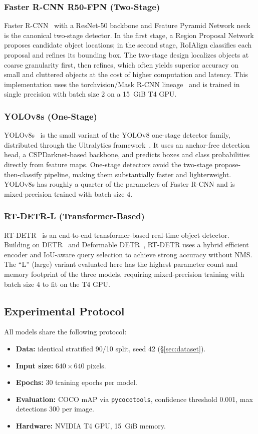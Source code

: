 \documentclass[11pt,a4paper]{article}
\begin{document}
\subsubsection{Faster R-CNN R50-FPN (Two-Stage)}
Faster R-CNN~\cite{fasterrcnn2015} with a ResNet-50 backbone and Feature Pyramid Network neck~\cite{fpn2017} is the canonical two-stage detector. In the first stage, a Region Proposal Network proposes candidate object locations; in the second stage, RoIAlign classifies each proposal and refines its bounding box. The two-stage design localizes objects at coarse granularity first, then refines, which often yields superior accuracy on small and cluttered objects at the cost of higher computation and latency. This implementation uses the torchvision/Mask R-CNN lineage~\cite{maskrcnn2017} and is trained in single precision with batch size 2 on a 15~GiB T4 GPU.

\subsubsection{YOLOv8s (One-Stage)}
YOLOv8s~\cite{yolov8_2023} is the small variant of the YOLOv8 one-stage detector family, distributed through the Ultralytics framework~\cite{ultralytics}. It uses an anchor-free detection head, a CSPDarknet-based backbone, and predicts boxes and class probabilities directly from feature maps. One-stage detectors avoid the two-stage propose-then-classify pipeline, making them substantially faster and lighterweight. YOLOv8s has roughly a quarter of the parameters of Faster R-CNN and is mixed-precision trained with batch size 4.

\subsubsection{RT-DETR-L (Transformer-Based)}
RT-DETR~\cite{rtdetr2024} is an end-to-end transformer-based real-time object detector. Building on DETR~\cite{detr2020} and Deformable DETR~\cite{deformable-detr2021}, RT-DETR uses a hybrid efficient encoder and IoU-aware query selection to achieve strong accuracy without NMS. The ``L'' (large) variant evaluated here has the highest parameter count and memory footprint of the three models, requiring mixed-precision training with batch size 4 to fit on the T4 GPU.
\subsection{Experimental Protocol}
\label{sec:methods-training}
All models share the following protocol:
\begin{itemize}[leftmargin=*]
  \item \textbf{Data:} identical stratified 90/10 split, seed 42 (\S\ref{sec:dataset}).
  \item \textbf{Input size:} $640\times640$ pixels.
  \item \textbf{Epochs:} 30 training epochs per model.
  \item \textbf{Evaluation:} COCO mAP via \texttt{pycocotools}, confidence threshold 0.001, max detections 300 per image.
  \item \textbf{Hardware:} NVIDIA T4 GPU, 15~GiB memory.
\end{itemize}
\end{document}
